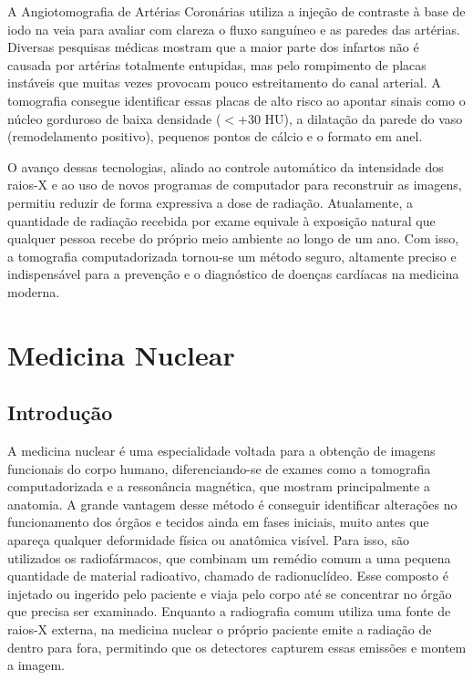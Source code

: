 \documentclass[a4paper,12pt,oneside,openright]{abntex2}
\begin{document}
A Angiotomografia de Artérias Coronárias utiliza a injeção de contraste à base de iodo na veia para avaliar com clareza o fluxo sanguíneo e as paredes das artérias. Diversas pesquisas médicas mostram que a maior parte dos infartos não é causada por artérias totalmente entupidas, mas pelo rompimento de placas instáveis que muitas vezes provocam pouco estreitamento do canal arterial. A tomografia consegue identificar essas placas de alto risco ao apontar sinais como o núcleo gorduroso de baixa densidade ($< +30\text{ HU}$), a dilatação da parede do vaso (remodelamento positivo), pequenos pontos de cálcio e o formato em anel.

O avanço dessas tecnologias, aliado ao controle automático da intensidade dos raios-X e ao uso de novos programas de computador para reconstruir as imagens, permitiu reduzir de forma expressiva a dose de radiação. Atualamente, a quantidade de radiação recebida por exame equivale à exposição natural que qualquer pessoa recebe do próprio meio ambiente ao longo de um ano. Com isso, a tomografia computadorizada tornou-se um método seguro, altamente preciso e indispensável para a prevenção e o diagnóstico de doenças cardíacas na medicina moderna.


\chapter{Medicina Nuclear}

\section{Introdução}

A medicina nuclear é uma especialidade voltada para a obtenção de imagens funcionais do corpo humano, diferenciando-se de exames como a tomografia computadorizada e a ressonância magnética, que mostram principalmente a anatomia. A grande vantagem desse método é conseguir identificar alterações no funcionamento dos órgãos e tecidos ainda em fases iniciais, muito antes que apareça qualquer deformidade física ou anatômica visível. Para isso, são utilizados os radiofármacos, que combinam um remédio comum a uma pequena quantidade de material radioativo, chamado de radionuclídeo. Esse composto é injetado ou ingerido pelo paciente e viaja pelo corpo até se concentrar no órgão que precisa ser examinado. Enquanto a radiografia comum utiliza uma fonte de raios-X externa, na medicina nuclear o próprio paciente emite a radiação de dentro para fora, permitindo que os detectores capturem essas emissões e montem a imagem.
\end{document}
